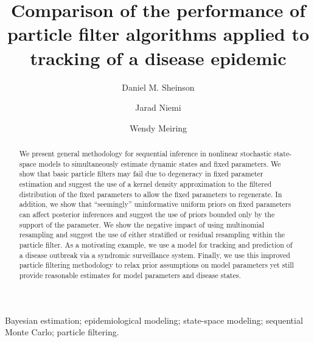 \documentclass{elsarticle}
\begin{document}
\begin{frontmatter}

\title{Comparison of the performance of particle filter algorithms applied to tracking of a disease epidemic}

\author[danny]{Daniel M. Sheinson}
\author[jarad]{Jarad Niemi}
\author[wendy]{Wendy Meiring}

\address[danny]{Corresponding author -- Department of Statistics and Applied Probability, University of California--Santa Barbara, \\ Santa Barbara, CA 93106, U.S.A., sheinson@pstat.ucsb.edu, 1-847-609-7824}
\address[jarad]{Department of Statistics, Iowa State University, Ames, IA 50011, U.S.A., niemi@iastate.edu}
\address[wendy]{Department of Statistics and Applied Probability, University of California--Santa Barbara, \\ Santa Barbara, CA 93106, U.S.A., meiring@pstat.ucsb.edu}

\begin{abstract}
We present general methodology for sequential inference in nonlinear stochastic state-space models to simultaneously estimate dynamic states and fixed parameters. We show that basic particle filters may fail due to degeneracy in fixed parameter estimation and suggest the use of a kernel density approximation to the filtered distribution of the fixed parameters to allow the fixed parameters to regenerate. In addition, we show that ``seemingly'' uninformative uniform priors on fixed parameters can affect posterior inferences and suggest the use of priors bounded only by the support of the parameter. We show the negative impact of using multinomial resampling and suggest the use of either stratified or residual resampling within the particle filter. As a motivating example, we use a model for tracking and prediction of a disease outbreak via a syndromic surveillance system. Finally, we use this improved particle filtering methodology to relax prior assumptions on model parameters yet still provide reasonable estimates for model parameters and disease states.	
\end{abstract}

\begin{keyword}
Bayesian estimation; epidemiological modeling; state-space modeling; sequential Monte Carlo; particle filtering.
\end{keyword}

\end{frontmatter}

\let\thefootnote\relax{}
\end{document}
